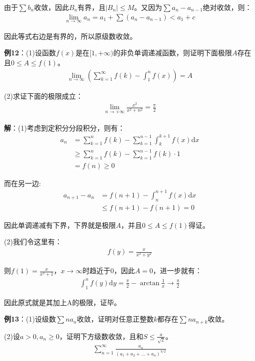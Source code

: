 \documentclass{ctexart}
\let\oldtextbf\textbf
\renewcommand{\textbf}[1]{\textcolor{brown!50!red}{\oldtextbf{#1}}}
\begin{document}
由于$\sum b_n$收敛，因此$B_n$有界，且$|B_n|\leq M$。又因为$\sum a_n-a_{n-1}$绝对收敛，则：
\begin{align*}
    \lim_{n\to\infty}a_n=a_1+\sum(a_n-a_{n-1})<a_1+c
\end{align*}

因此等式右边是有界的，所以原级数收敛。

\textbf{\color{brown!50!red}例12}：(1)设函数$f(x)$是在$[1,+\infty)$的非负单调递减函数，则证明下面极限$A$存在且$0\leq A\leq f(1)$。
\begin{align*}
    \lim_{n\to\infty}\left(\sum_{k=1}^\infty f(k)-\int_1^n f(x)\right)=A
\end{align*}

(2)求证下面的极限成立：
\begin{align*}
    \lim_{n\to+\infty}\frac{x^2}{x^2+n^2}=\frac{\pi}{2}
\end{align*}

\textbf{\color{brown!50!red}解}：(1)考虑到定积分分段积分，则有：
\begin{align*} 
 a_n&=\sum_{k=1}^nf(k)-\sum_{k=1}^{n-1}\int_{k}^{k+1}f(x)\mathrm{d}x\\
&\geq \sum_{k=1}^n f(k)-\sum_{k=1}^{n-1}f(k)\cdot1\\
&=f(n)\geq 0
\end{align*}

而在另一边:
\begin{align*} 
 a_{n+1}-a_n&=f(n+1)-\int_{n}^{n+1}f(x)\mathrm{d}x\\
&\leq  f(n+1)-f(n+1)=0
\end{align*}

因此单调递减有下界，下界就是极限$A$，并且$0\leq A\leq f(1)$得证。

(2)我们令这里有：
\begin{align*}
    f(y)=\frac{x}{x^2+y^2}
\end{align*}

则$f(1)=\frac{x}{x^2+1}$，$x\to\infty$时趋近于0，因此$A=0$，进一步就有：
\begin{align*}
    \int_1^nf(y)\mathrm{d}y=\frac{\pi}{2}-\arctan{\frac{1}{x}}\to\frac{\pi}{2}
\end{align*}

因此原式就是其加上A的极限，证毕。

\textbf{\color{brown!50!red}例13}：(1)设级数$\sum na_n$收敛，证明对任意正整数$k$都存在$\sum na_{n+k}$收敛。

(2)设$a>0,a_n\geq 0$，证明下方级数收敛，且和$S\leq \frac{a}{\sqrt{2}}$。
\begin{align*}
    \sum_{n=1}^\infty \frac{a_n}{(a_1+a_2+...+a_n)^{3/2}}
\end{align*}
\end{document}
